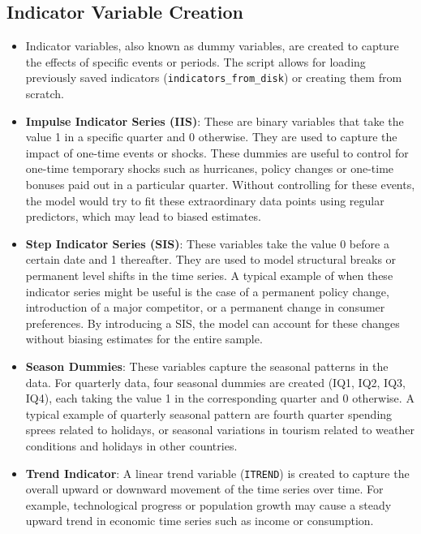 \documentclass[
  letterpaper,
  DIV=11,
  numbers=noendperiod]{scrreport}
\providecommand{\tightlist}{%
  \setlength{\itemsep}{0pt}\setlength{\parskip}{0pt}}\usepackage{longtable,booktabs,array}
\begin{document}
\subsection{Indicator Variable
Creation}\label{indicator-variable-creation}

\begin{itemize}
\tightlist
\item
  Indicator variables, also known as dummy variables, are created to
  capture the effects of specific events or periods. The script allows
  for loading previously saved indicators
  (\texttt{indicators\_from\_disk}) or creating them from scratch.\\
\item
  \textbf{Impulse Indicator Series (IIS)}: These are binary variables
  that take the value 1 in a specific quarter and 0 otherwise. They are
  used to capture the impact of one-time events or shocks. These dummies
  are useful to control for one-time temporary shocks such as
  hurricanes, policy changes or one-time bonuses paid out in a
  particular quarter. Without controlling for these events, the model
  would try to fit these extraordinary data points using regular
  predictors, which may lead to biased estimates.\\
\item
  \textbf{Step Indicator Series (SIS)}: These variables take the value 0
  before a certain date and 1 thereafter. They are used to model
  structural breaks or permanent level shifts in the time series. A
  typical example of when these indicator series might be useful is the
  case of a permanent policy change, introduction of a major competitor,
  or a permanent change in consumer preferences. By introducing a SIS,
  the model can account for these changes without biasing estimates for
  the entire sample.\\
\item
  \textbf{Season Dummies}: These variables capture the seasonal patterns
  in the data. For quarterly data, four seasonal dummies are created
  (IQ1, IQ2, IQ3, IQ4), each taking the value 1 in the corresponding
  quarter and 0 otherwise. A typical example of quarterly seasonal
  pattern are fourth quarter spending sprees related to holidays, or
  seasonal variations in tourism related to weather conditions and
  holidays in other countries.\\
\item
  \textbf{Trend Indicator}: A linear trend variable (\texttt{ITREND}) is
  created to capture the overall upward or downward movement of the time
  series over time. For example, technological progress or population
  growth may cause a steady upward trend in economic time series such as
  income or consumption.\\
\end{itemize}
\end{document}
